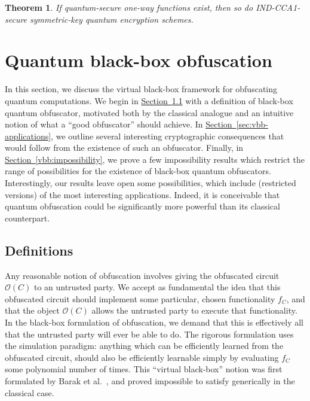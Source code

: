 \documentclass[11pt]{article}
\numberwithin{equation}{section}
\newtheorem{theorem}{Theorem}
\newcommand{\expref}[2]{\texorpdfstring{\hyperref[#2]{#1~\ref{#2}}}{#1~\ref{#2}}}
\newcommand{\algo}{\mathcal}
\begin{document}
{\begin{theorem}\label{thm:qOWF-implies-qSKE}
If quantum-secure one-way functions exist, then so do IND-CCA1-secure symmetric-key quantum encryption schemes.
\end{theorem}

\section{Quantum black-box obfuscation}\label{sec:black-box}

In this section, we discuss the virtual black-box framework for obfuscating quantum computations. We begin in \expref{Section}{sec:vbb-definitions} with a definition of black-box quantum obfuscator, motivated both by the classical analogue and an intuitive notion of what a ``good obfuscator'' should achieve. In \expref{Section}{sec:vbb-applications}, we outline several interesting cryptographic consequences that would follow from the existence of such an obfuscator. Finally, in \expref{Section}{vbb:impossibility}, we prove a few impossibility results which restrict the range of possibilities for the existence of black-box quantum obfuscators. Interestingly, our results leave open some possibilities, which include (restricted versions) of the most interesting applications. Indeed, it is conceivable that quantum obfuscation could be significantly more powerful than its classical counterpart.

\subsection{Definitions}\label{sec:vbb-definitions}

Any reasonable notion of obfuscation involves giving the obfuscated circuit $\algo O(C)$ to an untrusted party. We accept as fundamental the idea that this obfuscated circuit should implement some particular, chosen functionality $f_C$, and that the object $\algo O(C)$ allows the untrusted party to execute that functionality. In the black-box formulation of obfuscation, we demand that this is effectively all that the untrusted party will ever be able to do. The rigorous formulation uses the simulation paradigm: anything which can be efficiently learned from the obfuscated circuit, should also be efficiently learnable simply by evaluating $f_C$ some polynomial number of times. This ``virtual black-box'' notion was first formulated by Barak et al.~\cite{BGIRSVY12}, and proved impossible to satisfy generically in the classical case.

}
\end{document}
